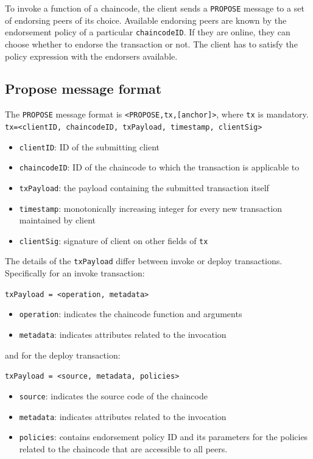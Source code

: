 To invoke a function of a chaincode, the client sends a \verb|PROPOSE| message to a set of endorsing peers of its choice. Available endorsing peers are known by the endorsement policy of a particular \verb|chaincodeID|. If they are online, they can choose whether to endorse the transaction or not. The client has to satisfy the policy expression with the endorsers available. 

\subsection{Propose message format}
The \verb|PROPOSE| message format is \verb|<PROPOSE,tx,[anchor]>|, where \verb|tx| is mandatory. 
    \verb|tx=<clientID, chaincodeID, txPayload, timestamp, clientSig>|
    \begin{itemize}
        \item \verb|clientID|: ID of the submitting client
        \item \verb|chaincodeID|: ID of the chaincode to which the transaction is applicable to
        \item \verb|txPayload|: the payload containing the submitted transaction itself
        \item \verb|timestamp|: monotonically increasing integer for every new transaction maintained by client
        \item \verb|clientSig|: signature of client on other fields of \verb|tx|
    \end{itemize}
The details of the \verb|txPayload| differ between invoke or deploy transactions. Specifically for an invoke transaction:

    \verb|txPayload = <operation, metadata>|
    \begin{itemize}
        \item \verb|operation|: indicates the chaincode function and arguments
        \item \verb|metadata|: indicates attributes related to the invocation
    \end{itemize}
    
and for the deploy transaction:

    \verb|txPayload = <source, metadata, policies>|
    \begin{itemize}
        \item \verb|source|: indicates the source code of the chaincode
        \item \verb|metadata|: indicates attributes related to the invocation
        \item \verb|policies|: contains endorsement policy ID and its parameters for the policies related to the chaincode that are accessible to all peers.
    \end{itemize}
    

